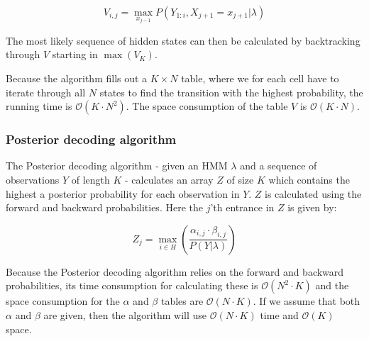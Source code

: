 $$V_{i,j} = \max\limits_{x_{j-1}} P(Y_{1:i}, X_{j+1} = x_{j+1}|\lambda)$$

The most likely sequence of hidden states can then be calculated by backtracking through $V$ starting in $\max(V_K)$.

Because the algorithm fills out a $ K \times  N $ table, where we for each cell have to iterate through all $ N $ states to find the transition with the highest probability, the running time is $\mathcal{O}(K \cdot  N ^2)$. The space consumption of the table $V$ is $\mathcal{O}(K \cdot  N )$.

\subsubsection{Posterior decoding algorithm}

The Posterior decoding algorithm\cite{Bishop} - given an HMM $\lambda$ and a sequence of observations $Y$ of length $K$ - calculates an array $Z$ of size $K$ which contains the highest a posterior probability for each observation in $Y$. 
$Z$ is calculated using the forward and backward probabilities. Here the $j$'th entrance in $Z$ is given by:

$$Z_j = \max\limits_{i\in H} (\frac{\alpha_{i,j}\cdot\beta_{i,j}}{P(Y|\lambda)})$$

Because the Posterior decoding algorithm relies on the forward and backward probabilities, its time consumption for calculating these is $\mathcal{O}( N^2\cdot K)$ and the space consumption for the $\alpha$ and $\beta$ tables are $\mathcal{O}( N\cdot K)$. If we assume that both $\alpha$ and $\beta$ are given, then the algorithm will use $\mathcal{O}( N\cdot K)$ time and $\mathcal{O}(K)$
space.



